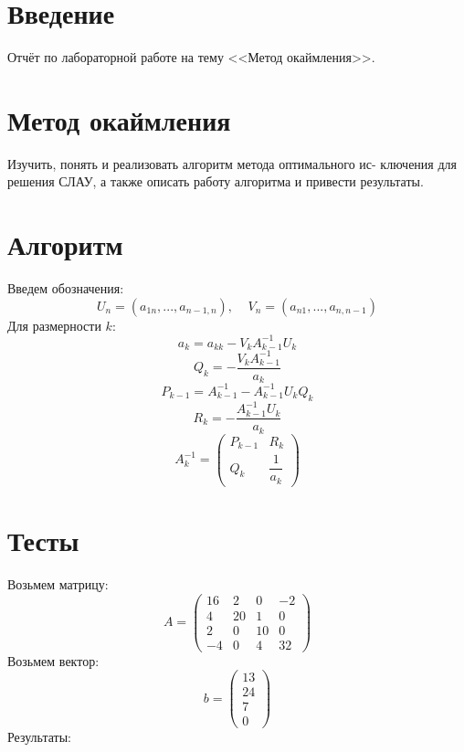 \documentclass[14pt, titlepage,fleqn]{extarticle}
\begin{document}
	

	
	
	\newpage
	
	\tableofcontents   
	\clearpage
	\section*{Введение}
	Отчёт по лабораторной работе на тему <<Метод окаймления>>.	
	\newpage









	\section*{Метод окаймления}
	Изучить, понять и реализовать алгоритм метода оптимального ис-
	ключения для решения СЛАУ, а также описать работу алгоритма и
	привести результаты.

	\section*{Алгоритм}
	Введем обозначения:
	\[U_n = (a_{1n},...,a_{n-1,n}), ~~~~~ V_n =(a_{n1},...,a_{n,n-1})\]
	Для размерности $k$:
	\[a_k = a_{kk} - V_kA^{-1}_{k-1}U_k\]
	\[Q_k = - \dfrac{V_kA^{-1}_{k-1}}{a_k}\]
	\[P_{k-1} = A^{-1}_{k-1} - A^{-1}_{k-1}U_kQ_k\]
	\[R_k = - \dfrac{A^{-1}_{k-1}U_k}{a_k}\]
	\[A^{-1}_k = \begin{pmatrix}
		P_{k-1} & R_k\\
		Q_k & \dfrac{1}{a_k}
	\end{pmatrix}\]
	\newpage
	\section*{Тесты}
	Возьмем матрицу:
	\[A = \begin{pmatrix}
		16& 2& 0& -2\\
        4& 20& 1& 0\\
        2& 0& 10& 0\\
        -4& 0& 4& 32
	\end{pmatrix}\]
	Возьмем вектор:
	\[b =\begin{pmatrix}
		13\\
		24\\
		7\\
		0
	\end{pmatrix} \]
	Результаты:
	\begin{figure}[H]
	\end{figure}
\end{document}
